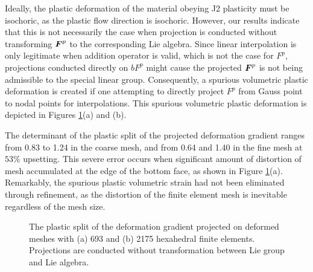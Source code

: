 \documentclass[12pt]{article}
\begin{document}
Ideally, the plastic deformation of the material obeying J2 plasticity 
must be isochoric, as the plastic flow direction is isochoric. However, 
our results indicate that this is not necessarily the case when projection
is conducted without transforming ${\boldsymbol{F}}^{p}$ to the corresponding Lie
algebra. Since linear interpolation is only legitimate when addition
operator is valid, which is not the case for $F^{p}$, projections
conducted directly on $bF^{p}$ might cause the projected ${\boldsymbol{F}}^{p}$ is
not being admissible to the special linear group. Consequently, a
spurious volumetric plastic deformation is created if one attempting
to directly project $F^{p}$ from Gauss point to nodal points for
interpolations. This spurious volumetric plastic deformation is
depicted in Figures \ref{fig:BilletNOLie}(a) and (b).

The determinant of the plastic split of the projected deformation
gradient ranges from 0.83 to 1.24 in the coarse mesh, and from 0.64 and
1.40 in the fine mesh at $53\%$ upsetting. This severe error occurs
when significant amount of distortion of mesh accumulated at the edge
of the bottom face, as shown in Figure \ref{fig:BilletNOLie}(a). Remarkably, 
the spurious plastic volumetric strain had not been eliminated through refinement, 
as the distortion of the finite element mesh is inevitable regardless of the mesh size. 
\begin{figure}[htbp]
  \begin{center}
    \unitlength=1.0mm
    \caption{The plastic split of the deformation gradient projected
      on deformed meshes with (a) 693 and (b) 2175 hexahedral finite
      elements. Projections are conducted without transformation
      between Lie group and Lie algebra.}
    \label{fig:BilletNOLie}
  \end{center}
\end{figure}
\end{document}
